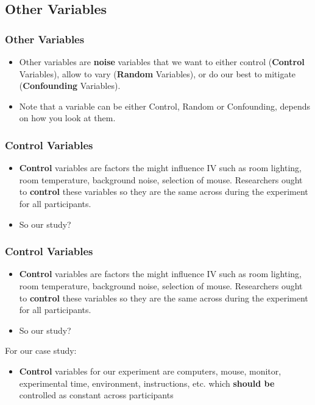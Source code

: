 \documentclass{beamer}
\begin{document}
\subsection{Other Variables}

\begin{frame}
	\frametitle{Other Variables}
	\begin{itemize}
		\item Other variables are \textbf{noise} variables that we want to either control (\textbf{Control} Variables),  allow to vary (\textbf{Random} Variables), or do our best to mitigate (\textbf{Confounding} Variables).  
		\item Note that a variable can be either Control, Random or Confounding, depends on how you look at them.
	\end{itemize}
\end{frame}

\begin{frame}
	\frametitle{Control Variables}
	\begin{itemize}
		\item  \textbf{Control} variables are factors the might influence IV such as room lighting, room temperature, background noise, selection of mouse.  Researchers ought to \textbf{control} these variables so they are the same across during the experiment for all participants.
		\item So our study?
	\end{itemize}
\end{frame}

\begin{frame}
	\frametitle{Control Variables}
	\begin{itemize}
		\item  \textbf{Control} variables are factors the might influence IV such as room lighting, room temperature, background noise, selection of mouse.  Researchers ought to \textbf{control} these variables so they are the same across during the experiment for all participants.
		\item So our study?
	\end{itemize}
	For our case study:
	\begin{itemize}
		\item \textbf{Control} variables for our experiment are computers, mouse, monitor, experimental time, environment, instructions, etc. which \textbf{should be} controlled as constant across participants
	\end{itemize}
\end{frame}
\end{document}
